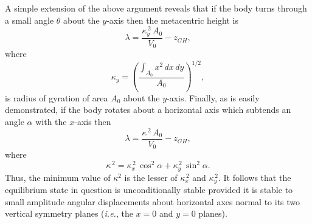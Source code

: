 A simple extension of the above argument reveals that if  the body turns through
a small angle $\theta$ about the $y$-axis then the metacentric height is
\begin{equation}
\lambda = \frac{\kappa_y^{\,2}\,A_0}{V_0}-z_{GH},
\end{equation}
where 
\begin{equation}
\kappa_y = \left(\frac{\int_{A_0}x^2\,dx\,dy}{A_0}\right)^{1/2},
\end{equation}
 is  radius of gyration of area $A_0$ about the $y$-axis. Finally, as is easily demonstrated, if the body rotates about a
horizontal axis which subtends an angle $\alpha$ with the $x$-axis then
\begin{equation}
\lambda = \frac{\kappa^{\,2}\,A_0}{V_0} -z_{GH},
\end{equation}
where 
\begin{equation}
\kappa^{\,2} = \kappa_x^{\,2}\,\cos^2\alpha+ \kappa_y^{\,2}\,\sin^2\alpha.
\end{equation}
Thus, the minimum value of $\kappa^2$ is the lesser of $\kappa_x^{\,2}$ and $\kappa_y^{\,2}$. It follows that
the equilibrium state in question is unconditionally stable provided it is stable to small
amplitude angular displacements about horizontal axes normal to its two vertical symmetry planes ({\em i.e.}, the $x=0$ and
$y=0$ planes). 

